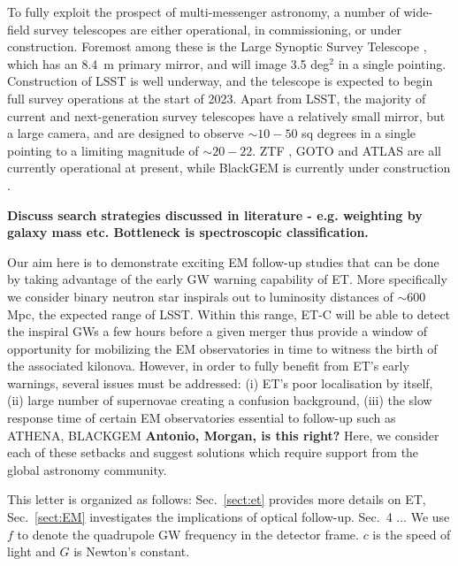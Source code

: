 \documentclass{aa}
\begin{document}
To fully exploit the prospect of multi-messenger astronomy, a number of wide-field survey telescopes are either operational, in commissioning, or under construction. Foremost among these is the Large Synoptic Survey Telescope \citep[LSST;][]{LSSTbook}, which has an 8.4~m primary mirror, and will image 3.5 deg$^2$ in a single pointing. Construction of LSST is well underway, and the telescope is expected to begin full survey operations at the start of 2023. Apart from LSST, the majority of current and next-generation survey telescopes have a relatively small mirror, but a large camera, and are designed to observe $\sim10 - 50$ sq degrees in a single pointing to a limiting magnitude of $\sim20-22$. ZTF \citep{ZTF}, GOTO \citep{GOTO} and ATLAS \citep{ATLAS} are all currently operational at present, while BlackGEM is currently under construction \citep{BlackGEM}.

{\bf Discuss search strategies discussed in literature - e.g. weighting by galaxy mass etc. Bottleneck is spectroscopic classification.}


Our aim here is to demonstrate exciting EM follow-up studies that can be done by taking advantage of the early GW warning capability of ET. More specifically we
consider binary neutron star inspirals
out to luminosity distances of $\sim 600\,$Mpc, 
the expected range of LSST. Within this range,
ET-C will be able to detect the inspiral GWs
a few hours before a given merger thus provide
a window of opportunity for mobilizing the EM
observatories in time to witness the birth of 
the associated kilonova. However, in order to
fully benefit from ET's early warnings, several
issues must be addressed: (i) ET's poor localisation by itself, (ii) large number of 
supernovae creating a confusion background, 
(iii) the slow response time of certain EM 
observatories essential to follow-up such as ATHENA, BLACKGEM {\bf Antonio, Morgan, is this right?}
Here, we consider each of these setbacks and
suggest solutions which require support from the global astronomy community.

This letter is organized as follows: Sec.~\ref{sect:et} provides more details on ET,
Sec.~\ref{sect:EM} investigates the implications
of optical follow-up. Sec.~4 ...
We use $f$ to denote the quadrupole GW frequency
in the detector frame. $c$ is the speed of light and $G$ is Newton's constant.
\end{document}

